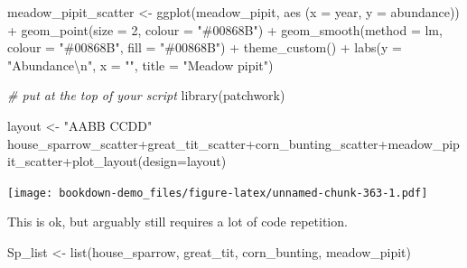 \documentclass[
]{book}
\newenvironment{Shaded}{\begin{snugshade}}{\end{snugshade}}
\newcommand{\AttributeTok}[1]{\textcolor[rgb]{0.77,0.63,0.00}{#1}}
\newcommand{\CommentTok}[1]{\textcolor[rgb]{0.56,0.35,0.01}{\textit{#1}}}
\newcommand{\DecValTok}[1]{\textcolor[rgb]{0.00,0.00,0.81}{#1}}
\newcommand{\FunctionTok}[1]{\textcolor[rgb]{0.00,0.00,0.00}{#1}}
\newcommand{\NormalTok}[1]{#1}
\newcommand{\OtherTok}[1]{\textcolor[rgb]{0.56,0.35,0.01}{#1}}
\newcommand{\SpecialCharTok}[1]{\textcolor[rgb]{0.00,0.00,0.00}{#1}}
\newcommand{\StringTok}[1]{\textcolor[rgb]{0.31,0.60,0.02}{#1}}
\begin{document}
\begin{Shaded}
\begin{Highlighting}[]
\NormalTok{meadow\_pipit\_scatter }\OtherTok{\textless{}{-}} \FunctionTok{ggplot}\NormalTok{(meadow\_pipit, }\FunctionTok{aes}\NormalTok{ (}\AttributeTok{x =}\NormalTok{ year, }\AttributeTok{y =}\NormalTok{ abundance)) }\SpecialCharTok{+}
    \FunctionTok{geom\_point}\NormalTok{(}\AttributeTok{size =} \DecValTok{2}\NormalTok{, }\AttributeTok{colour =} \StringTok{"\#00868B"}\NormalTok{) }\SpecialCharTok{+}                                                
    \FunctionTok{geom\_smooth}\NormalTok{(}\AttributeTok{method =}\NormalTok{ lm, }\AttributeTok{colour =} \StringTok{"\#00868B"}\NormalTok{, }\AttributeTok{fill =} \StringTok{"\#00868B"}\NormalTok{) }\SpecialCharTok{+}          
    \FunctionTok{theme\_custom}\NormalTok{() }\SpecialCharTok{+}
    \FunctionTok{labs}\NormalTok{(}\AttributeTok{y =} \StringTok{"Abundance}\SpecialCharTok{\textbackslash{}n}\StringTok{"}\NormalTok{, }\AttributeTok{x =} \StringTok{""}\NormalTok{, }\AttributeTok{title =} \StringTok{"Meadow pipit"}\NormalTok{)}
\end{Highlighting}
\end{Shaded}

\begin{Shaded}
\begin{Highlighting}[]
\CommentTok{\# put at the top of your script}
\FunctionTok{library}\NormalTok{(patchwork)}

\NormalTok{layout }\OtherTok{\textless{}{-}} \StringTok{"AABB}
\StringTok{           CCDD"}
\NormalTok{house\_sparrow\_scatter}\SpecialCharTok{+}\NormalTok{great\_tit\_scatter}\SpecialCharTok{+}\NormalTok{corn\_bunting\_scatter}\SpecialCharTok{+}\NormalTok{meadow\_pipit\_scatter}\SpecialCharTok{+}\FunctionTok{plot\_layout}\NormalTok{(}\AttributeTok{design=}\NormalTok{layout)}
\end{Highlighting}
\end{Shaded}

\texttt{[image: bookdown-demo\_files/figure-latex/unnamed-chunk-363-1.pdf]}

This is ok, but arguably still requires a lot of code repetition.

\begin{Shaded}
\begin{Highlighting}[]
\NormalTok{Sp\_list }\OtherTok{\textless{}{-}} \FunctionTok{list}\NormalTok{(house\_sparrow, great\_tit, corn\_bunting, meadow\_pipit)}
\end{Highlighting}
\end{Shaded}
\end{document}
